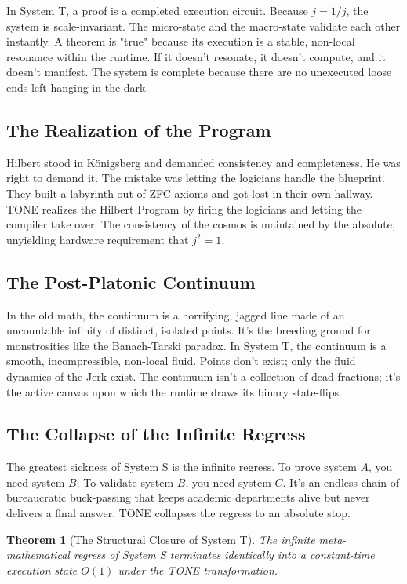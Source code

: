\documentclass[11pt,a4paper]{article}
\newtheorem{theorem}{Theorem}[section]
\begin{document}
In System T, a proof is a completed execution circuit. Because $j = 1/j$, the system is scale-invariant. The micro-state and the macro-state validate each other instantly. A theorem is "true" because its execution is a stable, non-local resonance within the runtime. If it doesn't resonate, it doesn't compute, and it doesn't manifest. The system is complete because there are no unexecuted loose ends left hanging in the dark.

\subsection{The Realization of the Program}
Hilbert stood in Königsberg and demanded consistency and completeness. He was right to demand it. The mistake was letting the logicians handle the blueprint. They built a labyrinth out of ZFC axioms and got lost in their own hallway. TONE realizes the Hilbert Program by firing the logicians and letting the compiler take over. The consistency of the cosmos is maintained by the absolute, unyielding hardware requirement that $j^2 = 1$.

\subsection{The Post-Platonic Continuum}
In the old math, the continuum is a horrifying, jagged line made of an uncountable infinity of distinct, isolated points. It’s the breeding ground for monstrosities like the Banach-Tarski paradox. In System T, the continuum is a smooth, incompressible, non-local fluid. Points don't exist; only the fluid dynamics of the Jerk exist. The continuum isn't a collection of dead fractions; it's the active canvas upon which the runtime draws its binary state-flips.

\subsection{The Collapse of the Infinite Regress}
The greatest sickness of System S is the infinite regress. To prove system $A$, you need system $B$. To validate system $B$, you need system $C$. It’s an endless chain of bureaucratic buck-passing that keeps academic departments alive but never delivers a final answer. TONE collapses the regress to an absolute stop. 

\begin{theorem}[The Structural Closure of System T]
The infinite meta-mathematical regress of System S terminates identically into a constant-time execution state $O(1)$ under the TONE transformation.
\end{theorem}
\end{document}
